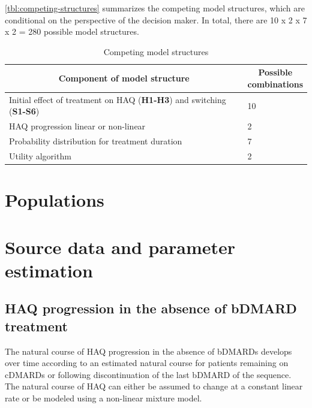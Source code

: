 \documentclass[11pt,final,fleqn]{article}\usepackage[]{graphicx}\usepackage[]{color}
\theoremstyle{plain}
\begin{document}
\autoref{tbl:competing-structures} summarizes the competing model structures, which are conditional on the perspective of the decision maker. In total, there are 10 x 2 x 7 x 2 = 280 possible model structures.

\renewcommand{\arraystretch}{1.5}

\begin{table}[!ht]
\begin{center}
\begin{threeparttable}
\caption{Competing model structures} \label{tbl:competing-structures}
\begin{tabular}{p{0.80\linewidth}p{0.20\linewidth}}
\hline
\multicolumn{1}{c}{Component of model structure} & \multicolumn{1}{c}{Possible combinations} \\
\hline
Initial effect of treatment on HAQ (\textbf{H1-H3}) and switching (\textbf{S1-S6}) & 10  \\
HAQ progression linear or non-linear & 2 \\
Probability distribution for treatment duration & 7 \\
Utility algorithm & 2 \\
\hline
\hline
\end{tabular}
\end{threeparttable}
\end{center}
\end{table}\renewcommand{\arraystretch}{1}

\section{Populations}\label{sec:populations}

\section{Source data and parameter estimation}\label{sec:data-parameters}

\subsection{HAQ progression in the absence of bDMARD
treatment}\label{haq-progression-in-the-absence-of-bdmard-treatment}

The natural course of HAQ progression in the absence of bDMARDs develops over time according to an estimated natural course for patients remaining on cDMARDs or following discontinuation of the last bDMARD of the sequence. The natural course of HAQ can either be assumed to change at a constant linear rate or be modeled using a non-linear mixture model. 
\end{document}
